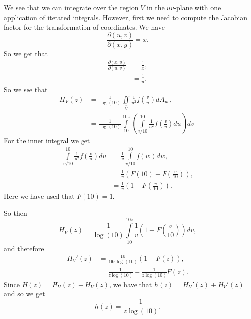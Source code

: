 We see that we can integrate over the region \(\overline{V}\) in the \(uv\)-plane with one application of iterated integrals. However,
first we need to compute the Jacobian factor for the transformation of coordinates. We have
\begin{equation}
\frac{\partial(u, v)}{\partial(x, y)} = x. 
\end{equation} 
So we get that
\begin{align}
\frac{\partial(x, y)}{\partial(u, v)} & = \frac{1}{x},\\
    & = \frac{1}{u}.
\end{align}
So we see that
\begin{align}
H_V(z) & = \frac{1}{\log(10)} \iint \limits_{\overline{V}} \frac{1}{u^2} f\left(\frac{v}{u}\right) dA_{uv}, \\
    & = \frac{1}{\log(10)} \int\limits_{10}^{10z} \left( \int\limits_{v/10}^{10} \frac{1}{u^2} f\left(\frac{v}{u}\right) du \right) dv.
\end{align}
For the inner integral we get
\begin{align}
\int\limits_{v/10}^{10} \frac{1}{u^2} f\left(\frac{v}{u}\right) du  & = \frac{1}{v} \int\limits_{v/10}^{10} f(w) dw, \\
    & = \frac{1}{v}\left(F(10) - F\left(\frac{v}{10}\right) \right), \\
    & =  \frac{1}{v}\left(1 - F\left(\frac{v}{10}\right) \right).
\end{align}
Here we have used that \(F(10) = 1\).

So then 
\begin{equation}
H_V(z) = \frac{1}{\log(10)} \int\limits_{10}^{10z} \frac{1}{v}\left(1 - F\left(\frac{v}{10}\right) \right) dv,
\end{equation}
and therefore
\begin{align}
H_V'(z) & = \frac{10}{10z\log(10)} \left(1 - F(z)\right), \\
    & = \frac{1}{z\log(10)} - \frac{1}{z\log(10)}F(z).
\end{align}
Since \(H(z) = H_U(z) + H_V(z)\), we have that \(h(z) = H_U'(z) + H_V'(z)\) and so we get 
\begin{equation}
h(z) = \frac{1}{z\log(10)}.
\end{equation}
